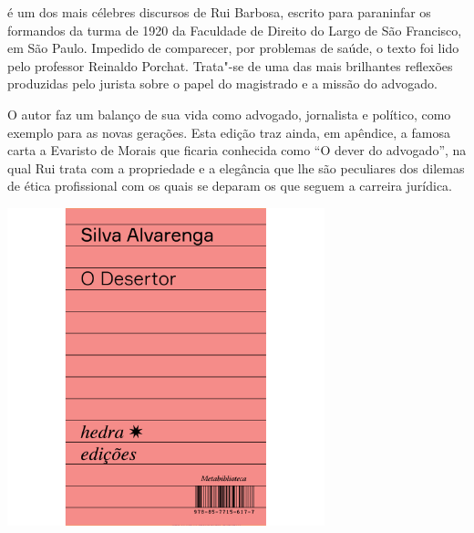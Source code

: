\medskip

 é um dos mais célebres discursos de Rui
Barbosa, escrito para paraninfar os formandos da
turma de 1920 da Faculdade de Direito do Largo de São Francisco, em São
Paulo. Impedido de comparecer,  por problemas de saúde, o texto foi
lido pelo professor Reinaldo Porchat. Trata"-se de uma das mais
brilhantes reflexões produzidas pelo jurista sobre o papel do
magistrado e a missão do advogado.

O autor faz um balanço de sua vida
como advogado, jornalista e político, como exemplo para as novas
gerações. Esta edição traz ainda, em apêndice, a famosa carta
a Evaristo de Morais que ficaria conhecida como ``O dever do advogado'',
na qual Rui trata com a propriedade e a elegância que lhe são peculiares
dos dilemas de ética profissional com os quais se deparam os que 
seguem a carreira jurídica. 

\vfill

\hspace*{-.4cm}\begin{minipage}[c]{.5\linewidth}
\small{
{}}
\end{minipage}

\pagebreak

\begin{center}
\hspace*{-2.5cm}
\hspace*{2.5cm}\includegraphics[width=92mm]{./grid/desertor.jpg}
\end{center}

